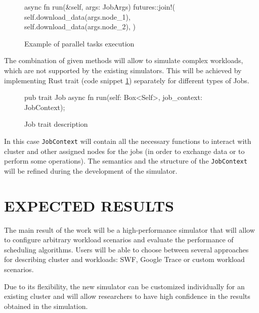 \documentclass[a4paper,10pt]{article}
\begin{document}
\begin{multicols*}{2}
\begin{figure}[H]
    \small
\vspace{-0.4cm}    
\begin{rustcode}
async fn run(&self, args: JobArgs) {    
    futures::join!(
        self.download_data(args.node_1),
        self.download_data(args.node_2),       
    )
}
\end{rustcode}
\vspace{-0.6cm}
\caption{Example of parallel tasks execution}
\end{figure}

The combination of given methods will allow to simulate complex workloads, which are not supported by the existing simulators. This will be achieved by implementing Rust trait (code snippet \ref{rust-job-trait}) separately for different types of Jobs. 

\begin{figure}[H]
    \small
\vspace{-0.4cm}    
\begin{rustcode}
pub trait Job {
    async fn run(self: Box<Self>, job_context: JobContext);
}
\end{rustcode}
\vspace{-0.6cm}
\caption{Job trait description}
\label{rust-job-trait}
\end{figure}

In this case \texttt{JobContext} will contain all the necessary functions to interact with cluster and other assigned nodes for the jobs (in order to exchange data or to perform some operations). The semantics and the structure of the \texttt{JobContext} will be refined during the development of the simulator.

\section{{\normalsize E}XPECTED {\normalsize R}ESULTS}

The main result of the work will be a high-performance simulator that will allow to configure arbitrary workload scenarios and evaluate the performance of scheduling algorithms. Users will be able to choose between several approaches for describing cluster and workloads: SWF, Google Trace or custom workload scenarios. 

Due to its flexibility, the new simulator can be customized individually for an existing cluster and will allow researchers to have high confidence in the results obtained in the simulation.


\end{multicols*}
\end{document}
